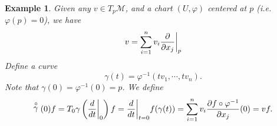 \documentclass[10pt]{article}
\newtheorem{example}{Example}[section]
\newcommand{\M}[0]{\mathcal{M}}
\newcommand{\pd}[2]{{\frac {\partial #1} {\partial #2}}}
\begin{document}
\begin{example}
  Given any $v\in T_p\M$, and a chart $(U,\varphi)$ centered at $p$ (i.e. $\varphi(p) = 0$), we have 
  \begin{equation*}
    v = \sum_{i=1}^n v_i \pd{}{x_j}\bigg{|}_p
  \end{equation*}
  Define a curve 
  \begin{equation*}
    \gamma(t) = \varphi^{-1}(tv_1,\cdots,tv_n).
  \end{equation*}
  Note that $\gamma(0) = \varphi^{-1}(0) = p$. We define 
  \begin{equation*}
    \stackrel{\circ}{\gamma}(0)f = T_0\gamma\left({\frac {d} {dt}}\bigg{|}_0\right)f = {\frac d {dt}}\bigg{|}_{t=0}f(\gamma(t))=\sum_{i=1}^nv_i\pd{f\circ\varphi^{-1}}{x_j}(0) = vf.
  \end{equation*}
\end{example}
\end{document}

